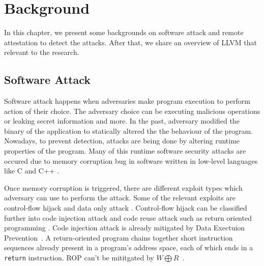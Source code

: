 
\chapter{Background} %

\label{Chapter2} %

In this chapter, we present some backgrounds on software attack and remote attestation to detect the attacks. After that, we share an overview of LLVM that relevant to the research. 

\section{Software Attack}


Software attack happens when adversaries make program execution to perform action of their choice. The adversary choice can be executing malicious operations or leaking secret information and more.  In the past, adversary modified the binary of the application to statically altered the the behaviour of the program. Nowadays, to prevent detection, attacks are being done by altering runtime properties of the program. Many of this runtime software security attacks are occured due to memory corruption bug in software written in low-level languages like C and C++ \cite{szekeresSoKEternalWar2013}.

Once memory corruption is triggered, there are different exploit types which adversary can use to perform the attack. Some of the relevant exploits are control-flow hijack \cite{shachamGeometryInnocentFlesh2007, schusterCounterfeitObjectorientedProgramming2015}  and data only attack \cite{chenNonControlDataAttacksAre2005, carliniControlFlowBendingEffectiveness2015}. Control-flow hijack can be classified further into code injection attack and code reuse attack such as return oriented programming \cite{roemerReturnorientedProgrammingSystems2012}.  Code injection attack is already mitigated by Data Exectuion Prevention~. A return-oriented program chains together short instruction sequences already present in a program’s address space, each of which ends in a \texttt{return} instruction. ROP can't be mititgated by \( W \bigoplus R \)~.
 

